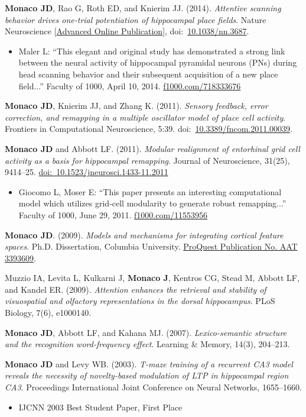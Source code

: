 \documentclass[10pt]{article}
\begin{document}
\begin{description}
\item \textbf{Monaco JD}, Rao G, Roth ED, and Knierim JJ. (2014). \emph{Attentive scanning behavior drives one-trial potentiation of hippocampal place fields}. Nature Neuroscience [\href{http://www.nature.com/neuro/journal/vaop/ncurrent/full/nn.3687.html}{Advanced Online Publication}], doi:~\href{http://dx.doi.org/10.1038/nn.3687}{10.1038/nn.3687}.
\begin{itemize}
  \item Maler L: ``This elegant and original study has demonstrated a strong link between the neural activity of hippocampal pyramidal neurons (PNs) during head scanning behavior and their subsequent acquisition of a new place field...'' Faculty of 1000, April 10, 2014. \href{http://f1000.com/718333676}{f1000.com/718333676}
\end{itemize}
\item \textbf{Monaco JD}, Knierim JJ, and Zhang K. (2011). \emph{Sensory feedback, error correction, and remapping in a multiple oscillator model of place cell activity}. Frontiers in Computational Neuroscience, 5:39. doi:~\href{http://dx.doi.org/10.3389/fncom.2011.00039}{10.3389/fncom.2011.00039}.
\pagebreak\item \textbf{Monaco JD} and Abbott LF. (2011). \emph{Modular realignment of entorhinal grid cell activity as a basis for hippocampal remapping}. Journal of Neuroscience, 31(25), 9414--25. \href{http://dx.doi.org/10.1523/JNEUROSCI.1433-11.2011}{doi:~10.1523/jneurosci.1433-11.2011}
\begin{itemize}
    \item Giocomo L, Moser E: ``This paper presents an interesting computational model which utilizes grid-cell modularity to generate robust remapping...'' Faculty of 1000, June 29, 2011. \href{http://f1000.com/11553956}{f1000.com/11553956}
\end{itemize}
\item \textbf{Monaco JD}. (2009). \emph{Models and mechanisms for integrating cortical feature spaces}. Ph.D. Dissertation, Columbia University. \href{http://gradworks.umi.com/33/93/3393609.html}{ProQuest Publication No. AAT 3393609}.
\item Muzzio IA, Levita L, Kulkarni J, \textbf{Monaco J}, Kentros CG, Stead M, Abbott LF, and Kandel ER. (2009). \emph{Attention enhances the retrieval and stability of visuospatial and olfactory representations in the dorsal hippocampus}. PLoS Biology, 7(6), e1000140.
\item \textbf{Monaco JD}, Abbott LF, and Kahana MJ. (2007). \emph{Lexico-semantic structure and the recognition word-frequency effect}. Learning \& Memory, 14(3), 204--213. 
\item \textbf{Monaco JD} and Levy WB. (2003). \emph{T-maze training of a recurrent CA3 model reveals the necessity of novelty-based modulation of LTP in hippocampal region CA3}. Proceedings International Joint Conference on Neural Networks, 1655--1660.\nopagebreak
\begin{itemize}
    \item IJCNN 2003 Best Student Paper, First Place
\end{itemize}
\end{description}
\end{document}
